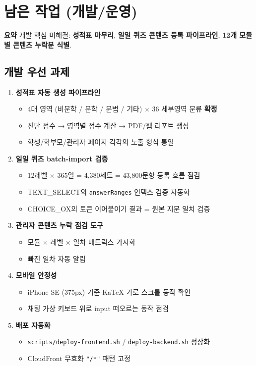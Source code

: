 \documentclass[11pt,a4paper]{article}
\newcommand{\summarybox}[1]{%
  \vspace{0.2cm}
  \noindent\colorbox{lightbg}{\parbox{\dimexpr\textwidth-2\fboxsep}{%
    \textbf{\color{korfarm}요약} \quad #1%
  }}
  \vspace{0.2cm}
}
\begin{document}
\newpage
\section{남은 작업 (개발/운영)}

\summarybox{개발 핵심 미해결: \textbf{성적표 마무리}, \textbf{일일 퀴즈 콘텐츠 등록 파이프라인}, \textbf{12개 모듈별 콘텐츠 누락분 식별}.}

\subsection{개발 우선 과제}

\begin{enumerate}
  \item \textbf{성적표 자동 생성 파이프라인}
    \begin{itemize}
      \item 4대 영역 (비문학 / 문학 / 문법 / 기타) × 36 세부영역 분류 \textbf{확정}
      \item 진단 점수 → 영역별 점수 계산 → PDF/웹 리포트 생성
      \item 학생/학부모/관리자 페이지 각각의 노출 형식 통일
    \end{itemize}
  \item \textbf{일일 퀴즈 batch-import 검증}
    \begin{itemize}
      \item 12레벨 × 365일 = 4,380세트 = 43,800문항 등록 흐름 점검
      \item TEXT\_SELECT의 \texttt{answerRanges} 인덱스 검증 자동화
      \item CHOICE\_OX의 토큰 이어붙이기 결과 = 원본 지문 일치 검증
    \end{itemize}
  \item \textbf{관리자 콘텐츠 누락 점검 도구}
    \begin{itemize}
      \item 모듈 × 레벨 × 일차 매트릭스 가시화
      \item 빠진 일차 자동 알림
    \end{itemize}
  \item \textbf{모바일 안정성}
    \begin{itemize}
      \item iPhone SE (375px) 기준 KaTeX 가로 스크롤 동작 확인
      \item 채팅 가상 키보드 위로 input 떠오르는 동작 점검
    \end{itemize}
  \item \textbf{배포 자동화}
    \begin{itemize}
      \item \texttt{scripts/deploy-frontend.sh} / \texttt{deploy-backend.sh} 정상화
      \item CloudFront 무효화 \texttt{"/*"} 패턴 고정
    \end{itemize}
\end{enumerate}
\end{document}
